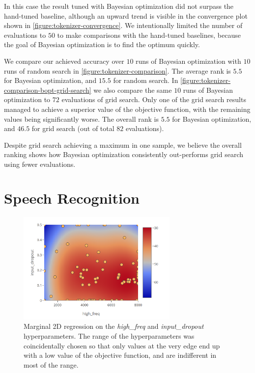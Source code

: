 In this case the result tuned with Bayesian optimization did not surpass the
hand-tuned baseline, although an upward trend is visible in the convergence
plot shown in \autoref{figure:tokenizer-convergence}. We intentionally limited
the number of evaluations to $50$ to make comparisons with the hand-tuned
baselines, because the goal of Bayesian optimization is to find the optimum
quickly.

We compare our achieved accuracy over $10$ runs of Bayesian optimization with
$10$ runs of random search in \autoref{figure:tokenizer-comparison}. The
average rank is $5.5$ for Bayesian optimization, and $15.5$ for random search.
In \autoref{figure:tokenizer-comparison-bopt-grid-search} we also compare the
same $10$ runs of Bayesian optimization to $72$ evaluations of grid search.
Only one of the grid search results managed to achieve a superior value of the
objective function, with the remaining values being significantly worse. The
overall rank is $5.5$ for Bayesian optimization, and $46.5$ for grid search
(out of total $82$ evaluations).

Despite grid search achieving a maximum in one sample, we believe the overall
ranking shows how Bayesian optimization consistently out-performs grid search
using fewer evaluations.

\section{Speech Recognition}

\begin{figure}
	\begin{center}
		\includegraphics[width=0.7\textwidth]{images/speech-2d-almost-insensitive.png}
		\caption{Marginal 2D regression on the \emph{high\_freq} and \emph{input\_dropout} hyperparameters. The range of the hyperparameters was coincidentally chosen so that only values at the very edge end up with a low value of the objective function, and are indifferent in most of the range.}
		\label{figure:2d-almost-insensitive}
	\end{center}
\end{figure}

